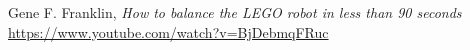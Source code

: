 \documentclass[twoside]{article}
\begin{document}
\begin{thebibliography}{9}

	Gene F. Franklin, \emph{How to balance the LEGO robot in less than 90 seconds} \url{https://www.youtube.com/watch?v=BjDebmqFRuc}

\end{thebibliography}
\end{document}
